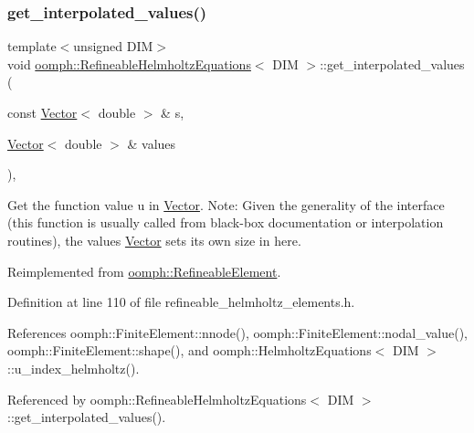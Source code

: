 \subsubsection{\texorpdfstring{get\+\_\+interpolated\+\_\+values()}{get\_interpolated\_values()}\hspace{0.1cm}{\footnotesize\ttfamily [1/2]}}
{\footnotesize\ttfamily template$<$unsigned D\+IM$>$ \\
void \hyperlink{classoomph_1_1RefineableHelmholtzEquations}{oomph\+::\+Refineable\+Helmholtz\+Equations}$<$ D\+IM $>$\+::get\+\_\+interpolated\+\_\+values (\begin{DoxyParamCaption}\item[{const \hyperlink{classoomph_1_1Vector}{Vector}$<$ double $>$ \&}]{s,  }\item[{\hyperlink{classoomph_1_1Vector}{Vector}$<$ double $>$ \&}]{values }\end{DoxyParamCaption})\hspace{0.3cm}{\ttfamily [inline]}, {\ttfamily [virtual]}}



Get the function value u in \hyperlink{classoomph_1_1Vector}{Vector}. Note\+: Given the generality of the interface (this function is usually called from black-\/box documentation or interpolation routines), the values \hyperlink{classoomph_1_1Vector}{Vector} sets its own size in here. 



Reimplemented from \hyperlink{classoomph_1_1RefineableElement_ad9a4f92880668a2373326d8306365c43}{oomph\+::\+Refineable\+Element}.



Definition at line 110 of file refineable\+\_\+helmholtz\+\_\+elements.\+h.



References oomph\+::\+Finite\+Element\+::nnode(), oomph\+::\+Finite\+Element\+::nodal\+\_\+value(), oomph\+::\+Finite\+Element\+::shape(), and oomph\+::\+Helmholtz\+Equations$<$ D\+I\+M $>$\+::u\+\_\+index\+\_\+helmholtz().



Referenced by oomph\+::\+Refineable\+Helmholtz\+Equations$<$ D\+I\+M $>$\+::get\+\_\+interpolated\+\_\+values().

\mbox{\label{classoomph_1_1RefineableHelmholtzEquations_aa9296bdeeb5699a279afb3813c81024f}} 
